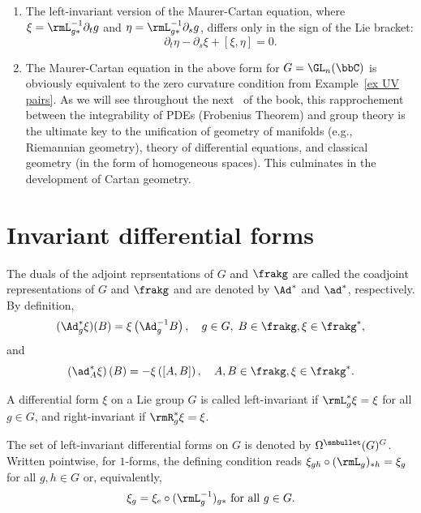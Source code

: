 \begin{rem}
    \begin{enumerate}
        \item The left-invariant version of the Maurer-Cartan equation, where $\xi=\rmL_{g\ast}^{-1}\partial_t g$ and $\eta =\rmL_{g\ast}^{-1}\partial_s g$, differs only in the sign of the Lie bracket: 
        \[\partial_t\eta-\partial_s\xi+[\xi,\eta]=0.\label{eq Maurer-Cartan left xi eta}\]
        \item The Maurer-Cartan equation in the above form for $G=\GL_n(\bbC)$ is obviously equivalent to the zero curvature condition from Example~\ref{ex UV pairs}. As we will see throughout the next \partt\ of the book, this rapprochement between the integrability of PDEs (Frobenius Theorem) and group theory is the ultimate key to the unification of geometry of manifolds (e.g., Riemannian geometry), theory of differential equations, and classical geometry (in the form of homogeneous spaces). This culminates in the development of Cartan geometry.
    \end{enumerate}
\end{rem}










\section{Invariant differential forms}\label{subsec: invariant diff forms}

\begin{defn}
    The duals of the adjoint reprsentations of $G$ and $\frakg$ are called the coadjoint representations of $G$ and $\frakg$ and are denoted by $\Ad^\ast$ and $\ad^\ast$, respectively. By definition,
    \[(\Ad^\ast_g \xi)(B)=\xi\left(\Ad_g^{-1}B\right),\quad  g\in G,\;B\in\frakg,\xi\in\frakg^\ast,\]
    and 
    \[\left(\ad_A^\ast \xi\right)(B)=-\xi\left([A,B]\right),\quad A,B\in\frakg,\xi\in\frakg^\ast.\]
\end{defn}


\begin{defn}
    A differential form $\xi$ on a Lie group $G$ is called left-invariant if $\rmL_g^\ast\xi =\xi $ for all $g\in G$, and right-invariant if $\rmR_g^\ast\xi=\xi$.

    The set of left-invariant differential forms on $G$ is denoted by $\Omega^{\smbullet }(G)^G$. Written pointwise, for $1$-forms, the defining condition reads $\xi_{gh}\circ (\rmL_g)_{\ast h}=\xi_g$ for all $g,h\in G$ or, equivalently,
    \[\xi_g=\xi_e\circ (\rmL_{g}^{-1})_{g\ast}\text{ for all }g\in G.\label{eq 5.5.1 RS1}\]
\end{defn}

